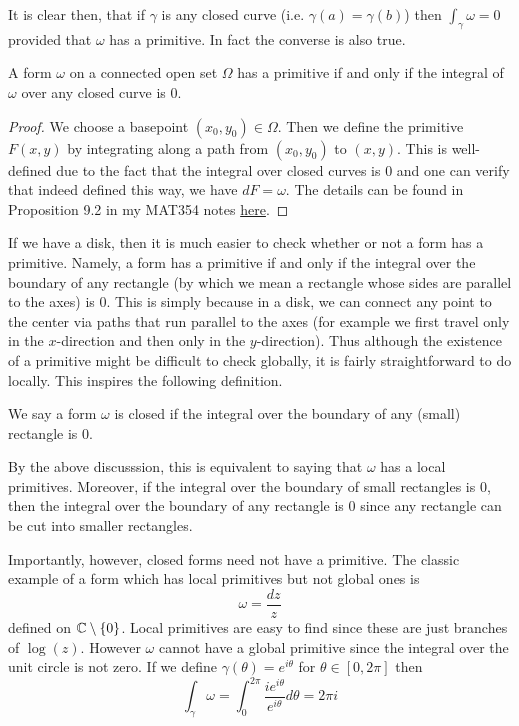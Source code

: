 It is clear then, that if $\gamma$ is any closed curve (i.e. $\gamma(a) = \gamma(b)$) then $\int_\gamma \omega = 0$ provided that $\omega$ has a primitive. In fact the converse is also true.
\begin{theorem}
A form $\omega$ on a connected open set $\Omega$ has a primitive if and only if the integral of $\omega$ over any closed curve is 0.
\end{theorem}
\begin{proof}
We choose a basepoint $(x_0, y_0) \in \Omega$. Then we define the primitive $F(x, y)$ by integrating along a path from $(x_0, y_0)$ to $(x, y)$. This is well-defined due to the fact that the integral over closed curves is 0 and one can verify that indeed defined this way, we have $dF = \omega$. The details can be found in Proposition 9.2 in my MAT354 notes \href{http://individual.utoronto.ca/rishibhp/notes/MAT354_notes.pdf}{here}. 
\end{proof}

If we have a disk, then it is much easier to check whether or not a form has a primitive. Namely, a form has a primitive if and only if the integral over the boundary of any rectangle (by which we mean a rectangle whose sides are parallel to the axes) is 0. This is simply because in a disk, we can connect any point to the center via paths that run parallel to the axes (for example we first travel only in the $x$-direction and then only in the $y$-direction). Thus although the existence of a primitive might be difficult to check globally, it is fairly straightforward to do locally. This inspires the following definition.

\begin{definition}
    We say a form $\omega$ is closed if the integral over the boundary of any (small) rectangle is 0.
\end{definition}
By the above discusssion, this is equivalent to saying that $\omega$ has a local primitives. Moreover, if the integral over the boundary of small rectangles is 0, then the integral over the boundary of any rectangle is 0 since any rectangle can be cut into smaller rectangles.

Importantly, however, closed forms need not have a primitive. The classic example of a form which has local primitives but not global ones is 
$$ \omega = \frac{dz}{z}$$
defined on $\mathbb{C} \setminus \{0\}$. Local primitives are easy to find since these are just branches of $\log(z)$. However $\omega$ cannot have a global primitive since the integral over the unit circle is not zero. If we define $\gamma(\theta) = e^{i \theta}$ for $\theta \in [0, 2\pi]$ then
$$\int_\gamma \omega = \int_0^{2\pi} \frac{i e^{i\theta}}{e^{i \theta}} d\theta = 2\pi i$$

